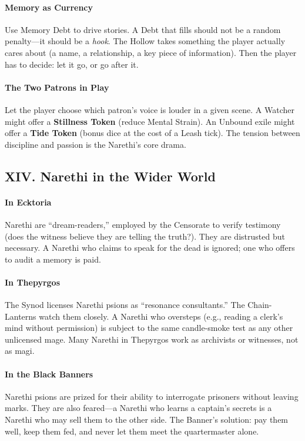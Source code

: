 \documentclass[11pt]{article}
\begin{document}
\paragraph{Memory as Currency} Use Memory Debt to drive stories. A Debt that fills should not be a random penalty---it should be a \textit{hook}. The Hollow takes something the player actually cares about (a name, a relationship, a key piece of information). Then the player has to decide: let it go, or go after it.

\paragraph{The Two Patrons in Play} Let the player choose which patron's voice is louder in a given scene. A Watcher might offer a \textbf{Stillness Token} (reduce Mental Strain). An Unbound exile might offer a \textbf{Tide Token} (bonus dice at the cost of a Leash tick). The tension between discipline and passion is the Narethi's core drama.

\subsection*{XIV. Narethi in the Wider World}
\paragraph{In Ecktoria} Narethi are ``dream-readers,'' employed by the Censorate to verify testimony (does the witness believe they are telling the truth?). They are distrusted but necessary. A Narethi who claims to speak for the dead is ignored; one who offers to audit a memory is paid.

\paragraph{In Thepyrgos} The Synod licenses Narethi psions as ``resonance consultants.'' The Chain-Lanterns watch them closely. A Narethi who oversteps (e.g., reading a clerk's mind without permission) is subject to the same candle-smoke test as any other unlicensed mage. Many Narethi in Thepyrgos work as archivists or witnesses, not as magi.

\paragraph{In the Black Banners} Narethi psions are prized for their ability to interrogate prisoners without leaving marks. They are also feared---a Narethi who learns a captain's secrets is a Narethi who may sell them to the other side. The Banner's solution: pay them well, keep them fed, and never let them meet the quartermaster alone.
\end{document}
